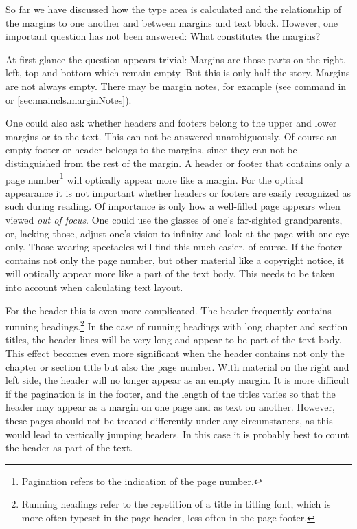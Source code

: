 \begin{Declaration}
\end{Declaration}%
\begin{Explain}%
  So far we have discussed how the type area is
  calculated and the relationship of the
  margins to one another and between margins and text
  block. However, one important question has not been answered: What
  constitutes the margins?

  At first glance the question appears trivial: Margins are those parts on the
  right, left, top and bottom which remain empty. But this is only half the
  story. Margins are not always empty. There may be margin notes, for example
  (see  command in \cite{lshort} or
  \autoref{sec:maincls.marginNotes}).

  One could also ask whether headers and
  footers belong to the upper and lower margins or
  to the text. This can not be answered unambiguously. Of course an
  empty footer or header belongs to the margins, since they can not be
  distinguished from the rest of the margin. A header or footer that
  contains only a page
  number\footnote{Pagination refers to
    the indication of the page number.} will optically appear more
  like a margin. For the optical appearance it is not important
  whether headers or footers are easily recognized as such during
  reading.  Of importance is only how a well-filled page appears when
  viewed \emph{out of focus}. One could use the glasses of one's
  far-sighted grandparents, or, lacking those, adjust one's vision to
  infinity and look at the page with one eye only. Those wearing
  spectacles will find this much easier, of course.  If the footer
  contains not only the page number, but other material like a
  copyright notice, it will optically appear more like a part of the
  text body.  This needs to be taken into account when calculating
  text layout.

  For the header this is even more complicated. The header frequently
  contains running headings.\footnote{Running headings refer to the repetition of a
    title in titling font, which is more often typeset in the page
    header, less often in the page footer.}  In the case of running
  headings with long chapter and section titles, the header lines will
  be very long and appear to be part of the text body.  This effect
  becomes even more significant when the header contains not only the
  chapter or section title but also the page number. With material on
  the right and left side, the header will no longer appear as an
  empty margin. It is more difficult if the pagination is in the
  footer, and the length of the titles varies so that the header may
  appear as a margin on one page and as text on another.  However,
  these pages should not be treated differently under any
  circumstances, as this would lead to vertically jumping headers. In
  this case it is probably best to count the header as part of the
  text.


\end{Explain}
